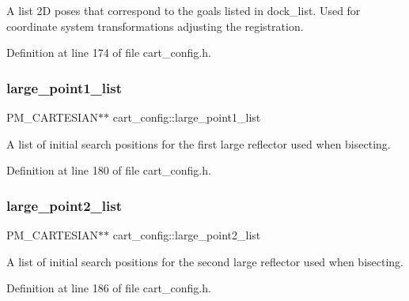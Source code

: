 A list 2D poses that correspond to the goals listed in dock\+\_\+list. Used for coordinate system transformations adjusting the registration. 

Definition at line 174 of file cart\+\_\+config.\+h.

\mbox{\label{classcart__config_ae86eebedcace9bd7afabc6f264051ceb}} 
\subsubsection{\texorpdfstring{large\+\_\+point1\+\_\+list}{large\_point1\_list}}
{\footnotesize\ttfamily P\+M\+\_\+\+C\+A\+R\+T\+E\+S\+I\+AN$\ast$$\ast$ cart\+\_\+config\+::large\+\_\+point1\+\_\+list\hspace{0.3cm}{\ttfamily [private]}}

A list of initial search positions for the first large reflector used when bisecting. 

Definition at line 180 of file cart\+\_\+config.\+h.

\mbox{\label{classcart__config_a8f71e861e41c9f8fee2c05f2bad2d31e}} 
\subsubsection{\texorpdfstring{large\+\_\+point2\+\_\+list}{large\_point2\_list}}
{\footnotesize\ttfamily P\+M\+\_\+\+C\+A\+R\+T\+E\+S\+I\+AN$\ast$$\ast$ cart\+\_\+config\+::large\+\_\+point2\+\_\+list\hspace{0.3cm}{\ttfamily [private]}}

A list of initial search positions for the second large reflector used when bisecting. 

Definition at line 186 of file cart\+\_\+config.\+h.

\mbox{\label{classcart__config_a79325b64754bf4e6135d77234c85e2d8}} 
